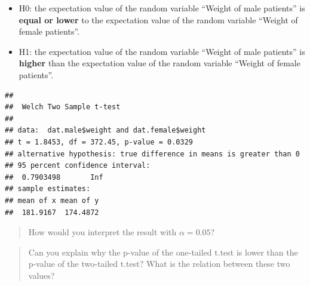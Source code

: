 \documentclass[
]{book}
\newenvironment{Shaded}{\begin{snugshade}}{\end{snugshade}}
\newcommand{\AttributeTok}[1]{\textcolor[rgb]{0.13,0.29,0.53}{#1}}
\newcommand{\CommentTok}[1]{\textcolor[rgb]{0.56,0.35,0.01}{\textit{#1}}}
\newcommand{\FunctionTok}[1]{\textcolor[rgb]{0.13,0.29,0.53}{\textbf{#1}}}
\newcommand{\NormalTok}[1]{#1}
\newcommand{\SpecialCharTok}[1]{\textcolor[rgb]{0.81,0.36,0.00}{\textbf{#1}}}
\newcommand{\StringTok}[1]{\textcolor[rgb]{0.31,0.60,0.02}{#1}}
\begin{document}
\begin{itemize}
\item
  H0: the expectation value of the random variable ``Weight of male patients'' is \textbf{equal or lower} to the expectation value of the random variable ``Weight of female patients''.\\
\item
  H1: the expectation value of the random variable ``Weight of male patients'' is \textbf{higher} than the expectation value of the random variable ``Weight of female patients''.
\end{itemize}

\begin{Shaded}
\end{Shaded}

\begin{verbatim}
## 
##  Welch Two Sample t-test
## 
## data:  dat.male$weight and dat.female$weight
## t = 1.8453, df = 372.45, p-value = 0.0329
## alternative hypothesis: true difference in means is greater than 0
## 95 percent confidence interval:
##  0.7903498       Inf
## sample estimates:
## mean of x mean of y 
##  181.9167  174.4872
\end{verbatim}

\begin{quote}
How would you interpret the result with \(\alpha=0.05\)?
\end{quote}

\begin{quote}
Can you explain why the p-value of the one-tailed t.test is lower than the p-value of the two-tailed t.test?
What is the relation between these two values?
\end{quote}

\begin{Shaded}
\end{Shaded}
\end{document}
